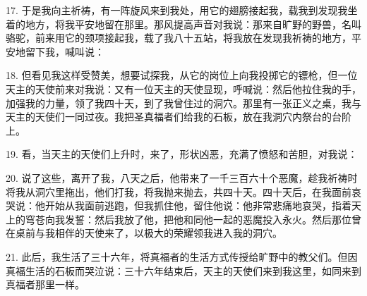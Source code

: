 17. 于是我向主祈祷，有一阵旋风来到我处，用它的翅膀接起我，载我到发现我坐着的地方，将我平安地留在那里。那风提高声音对我说：那来自旷野的野兽，名叫骆驼，前来用它的颈项接起我，载了我八十五站，将我放在发现我祈祷的地方，平安地留下我，喊叫说：\par

18. 但看见我这样受赞美，想要试探我，从它的岗位上向我投掷它的镖枪，但一位天主的天使前来对我说：又有一位天主的天使显现，呼喊说：然后他拉住我的手，加强我的力量，领了我四十天，到了我曾住过的洞穴。那里有一张正义之桌，我与天主的天使们一同过夜。我把圣真福者们给我的石板，放在我洞穴内祭台的台阶上。\par

19. 看，当天主的天使们上升时，来了，形状凶恶，充满了愤怒和苦胆，对我说：\par

20. 说了这些，离开了我，八天之后，他带来了一千三百六十个恶魔，趁我祈祷时将我从洞穴里拖出，他们打我，将我抛来抛去，共四十天。四十天后，在我面前哀哭说：他开始从我面前逃跑，但我抓住他，留住他说：他非常悲痛地哀哭，指着天上的穹苍向我发誓：然后我放了他，把他和同他一起的恶魔投入永火。然后那位曾在桌前与我相伴的天使来了，以极大的荣耀领我进入我的洞穴。\par

21. 此后，我生活了三十六年，将真福者的生活方式传授给旷野中的教父们。但因真福生活的石板而哭泣说：三十六年结束后，天主的天使们来到我这里，如同来到真福者那里一样。\par

